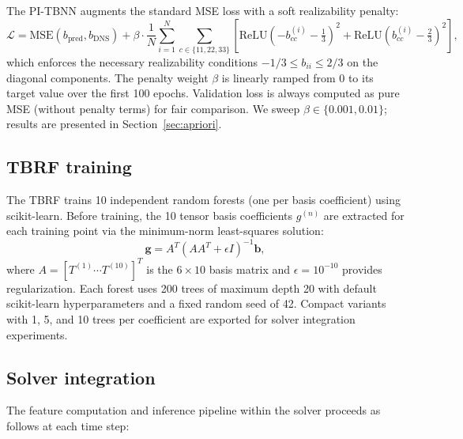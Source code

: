 The PI-TBNN augments the standard MSE loss with a soft realizability penalty:
\begin{equation}
    \mathcal{L} = \mathrm{MSE}(b_{\mathrm{pred}}, b_{\mathrm{DNS}}) + \beta \cdot \frac{1}{N}\sum_{i=1}^{N} \sum_{c \in \{11,22,33\}} \left[\mathrm{ReLU}\!\left(-b_{cc}^{(i)} - \tfrac{1}{3}\right)^2 + \mathrm{ReLU}\!\left(b_{cc}^{(i)} - \tfrac{2}{3}\right)^2\right],
    \label{eq:pi_loss}
\end{equation}
which enforces the necessary realizability conditions $-1/3 \leq b_{ii} \leq 2/3$ on the diagonal components.
The penalty weight $\beta$ is linearly ramped from 0 to its target value over the first 100 epochs.
Validation loss is always computed as pure MSE (without penalty terms) for fair comparison.
We sweep $\beta \in \{0.001, 0.01\}$; results are presented in Section~\ref{sec:apriori}.

\subsection{TBRF training}

The TBRF \citep{Kaandorp2020} trains 10 independent random forests (one per basis coefficient) using scikit-learn.
Before training, the 10 tensor basis coefficients $g^{(n)}$ are extracted for each training point via the minimum-norm least-squares solution:
\begin{equation}
    \bm{g} = A^T (A A^T + \epsilon I)^{-1} \bm{b},
\end{equation}
where $A = [T^{(1)} \cdots T^{(10)}]^T$ is the $6 \times 10$ basis matrix and $\epsilon = 10^{-10}$ provides regularization.
Each forest uses 200 trees of maximum depth 20 with default scikit-learn hyperparameters and a fixed random seed of 42.
Compact variants with 1, 5, and 10 trees per coefficient are exported for solver integration experiments.

\subsection{Solver integration}
\label{sec:solver_integration}

The feature computation and inference pipeline within the solver proceeds as follows at each time step:

